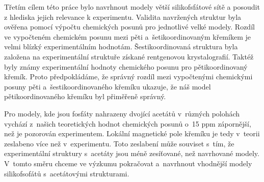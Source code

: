 \documentclass[
digital, %
table,   %
lof,     %
lot,     %
oneside,
]{fithesis3}
\begin{document}
Třetím cílem této práce bylo navrhnout modely větší silikofsfátové sítě a posoudit z hlediska jejich relevance k experimentu. Validita navržených struktur byla ověřena pomocí výpočtu chemických posunů pro jednotlivé velké modely. Rozdíl ve vypočteném chemickém posunu mezi pěti a~šetikoordinovaným křemíkem je velmi blízký experimentálním hodnotám.  Šestikoordinovaná struktura byla založena na experimentální struktuře získané rentgenovou krystalografií. Taktéž byly známy experimentální hodnoty chemického posunu pro pětikoordinovaný křemík. Proto předpokládáme, že správný rozdíl mezi vypočtenými chemickými posuny pěti a~šestikoordinovaného křemíku ukazuje, že náš model pětikoordinovaného křemíku byl přiměřeně správný.

Pro modely, kde jsou fosfáty nahrazeny dvojící acetátů v~různých polohách vychází z~našich teoretických hodnot chemických posunů o~15 ppm zápornější, než je pozorován experimentem. Lokální magnetické pole křemíku je tedy v~teorii zeslabeno více než v~experimentu. Toto zeslabení může souviset s~tím, že experimentální struktury s~acetáty jsou méně zesíťované, než navrhované modely. V~tomto směru chceme ve výzkumu pokračovat a~navrhnout vhodnější modely silikofsofátů s~acetátovými strukturami.




\newpage
\end{document}
